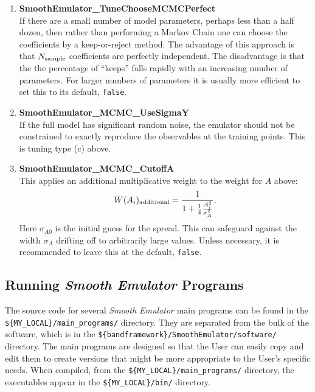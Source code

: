 \documentclass[UserManual.tex]{subfiles}
\begin{document}
\begin{enumerate}
\item {\bf SmoothEmulator\_TuneChooseMCMCPerfect}\\
If there are a small number of model parameters, perhaps less than a half dozen, then rather than performing a Markov Chain one can choose the coefficients by a keep-or-reject method. The advantage of this approach is that $N_{\rm sample}$ coefficients are perfectly independent. The disadvantage is that the the percentage of ``keeps'' falls rapidly with an increasing number of parameters. For larger numbers of parameters it is usually more efficient to set this to its default, {\tt false}. 

\item {\bf SmoothEmulator\_MCMC\_UseSigmaY}\\
If the full model has significant random noise, the emulator should not be constrained to exactly reproduce the observables at the training points. This is tuning type (c) above. 

\item {\bf SmoothEmulator\_MCMC\_CutoffA}\\
This applies an additional multiplicative weight to the weight for $A$ above:
\[
W(A_i)_{\rm additional}=\frac{1}{1+\frac{1}{4}\frac{A_i^2}{\sigma_{A}^2}}.
\] 
Here $\sigma_{A0}$ is the initial guess for the spread. This can safeguard against the width $\sigma_A$ drifting off to arbitrarily large values. Unless necessary, it is recommended to leave this at the default, {\tt false}.

\end{enumerate}

\subsection{Running {\it Smooth Emulator} Programs}

The source code for several {\it Smooth Emulator} main programs can be found in the \\{\tt \$\{MY\_LOCAL\}/main\_programs/} directory. They are separated from the bulk of the software, which is in the {\tt \$\{bandframework\}/SmoothEmulator/software/} directory. The main programs are designed so that the User can easily copy and edit them to create versions that might be more appropriate to the User's specific needs. When compiled, from the {\tt \$\{MY\_LOCAL\}/main\_programs/} directory, the executables appear in the {\tt \$\{MY\_LOCAL\}/bin/} directory. 
\end{document}
